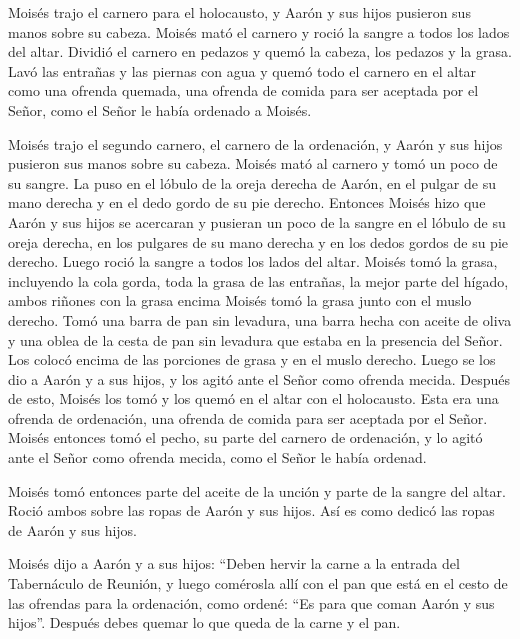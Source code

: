  Moisés trajo el carnero para el holocausto, y Aarón y sus
hijos pusieron sus manos sobre su cabeza.  Moisés mató el
carnero y roció la sangre a todos los lados del altar. 
Dividió el carnero en pedazos y quemó la cabeza, los pedazos y la grasa.
 Lavó las entrañas y las piernas con agua y quemó todo el
carnero en el altar como una ofrenda quemada, una ofrenda de comida para
ser aceptada por el Señor, como el Señor le había ordenado a Moisés.

 Moisés trajo el segundo carnero, el carnero de la
ordenación, y Aarón y sus hijos pusieron sus manos sobre su cabeza.
 Moisés mató al carnero y tomó un poco de su sangre. La
puso en el lóbulo de la oreja derecha de Aarón, en el pulgar de su mano
derecha y en el dedo gordo de su pie derecho.  Entonces
Moisés hizo que Aarón y sus hijos se acercaran y pusieran un poco de la
sangre en el lóbulo de su oreja derecha, en los pulgares de su mano
derecha y en los dedos gordos de su pie derecho. Luego roció la sangre a
todos los lados del altar.  Moisés tomó la grasa,
incluyendo la cola gorda, toda la grasa de las entrañas, la mejor parte
del hígado, ambos riñones con la grasa encima Moisés tomó la grasa junto
con el muslo derecho.  Tomó una barra de pan sin levadura,
una barra hecha con aceite de oliva y una oblea de la cesta de pan sin
levadura que estaba en la presencia del Señor. Los colocó encima de las
porciones de grasa y en el muslo derecho.  Luego se los dio
a Aarón y a sus hijos, y los agitó ante el Señor como ofrenda mecida.
 Después de esto, Moisés los tomó y los quemó en el altar
con el holocausto. Esta era una ofrenda de ordenación, una ofrenda de
comida para ser aceptada por el Señor.  Moisés entonces
tomó el pecho, su parte del carnero de ordenación, y lo agitó ante el
Señor como ofrenda mecida, como el Señor le había ordenad.

 Moisés tomó entonces parte del aceite de la unción y parte
de la sangre del altar. Roció ambos sobre las ropas de Aarón y sus
hijos. Así es como dedicó las ropas de Aarón y sus hijos.

 Moisés dijo a Aarón y a sus hijos: ``Deben hervir la carne
a la entrada del Tabernáculo de Reunión, y luego comérosla allí con el
pan que está en el cesto de las ofrendas para la ordenación, como
ordené: ``Es para que coman Aarón y sus hijos''.  Después
debes quemar lo que queda de la carne y el pan.

